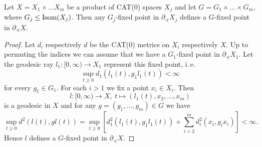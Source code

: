\begin{lemma}[{\cite[Lemma~2.9]{MR3509968}}]
  \label{lem:2.9}
  Let \(X = X_1 \times \dots X_m\) be a product of CAT(0) spaces \(X_j\) and let \(G = G_1 \times \dots \times G_m\), where \(G_j \leq \operatorname{Isom}(X_j)\). Then any \(G_j\)-fixed point in \(\partial_\sphericalangle X_j\) defines a \(G\)-fixed point in \(\partial_\sphericalangle X\).
\end{lemma}

\begin{proof}
  Let \(d_i\) respectively \(d\) be the CAT(0) metrics on \(X_i\) respectively \(X\). Up to permuting the indices we can assume that we have a \(G_1\)-fixed point in \(\partial_\sphericalangle X_1\). Let the geodesic ray \(l_1\colon [0,\infty) \to X_1\) represent this fixed point, i.\,e.\
  \[
    \sup_{t \geq 0} d_1(l_1(t), g_1l_1(t)) < \infty
  \]
  for every \(g_1 \in G_1\). For each \(i > 1\) we fix a point \(x_i \in X_i\). Then
  \[
    l\colon [0, \infty) \to X,\ t \mapsto (l_1(t), x_2, \dots, x_m)
  \]
  is a geodesic in \(X\) and for any \(g = (g_1, \dots, g_m) \in G\) we have
  \[
    \sup_{t \geq 0} d^2(l(t), gl(t)) = \sup_{t \geq 0} \left [ d_1^2(l_1(t), g_1l_1(t)) + \sum_{i=2}^m d_i^2(x_i, g_ix_i)\right] < \infty.
  \]
  Hence \(l\) defines a \(G\)-fixed point in \(\partial_\sphericalangle X\).
\end{proof}


